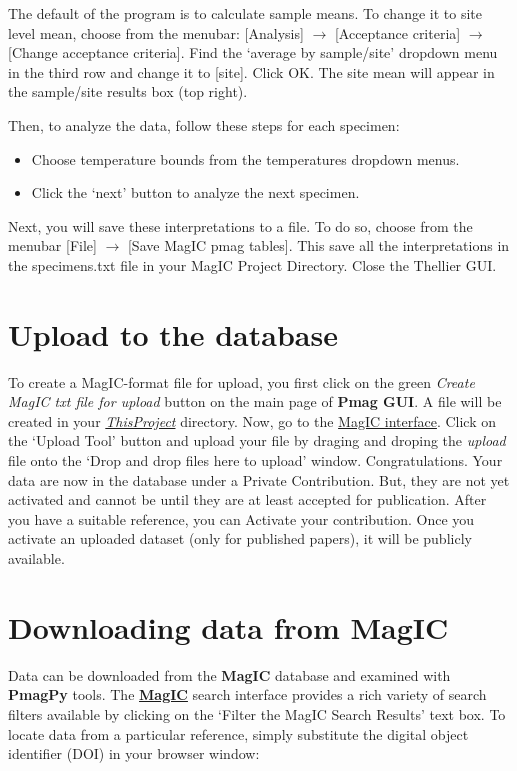 \documentclass[11pt]{book}
\begin{document}
{{The default of the program is to calculate sample means. To change it to site level mean, choose from the menubar: [Analysis] $\rightarrow$ [Acceptance criteria] $\rightarrow$  [Change acceptance criteria]. Find the `average by sample/site' dropdown menu in the third row and change it to [site]. Click OK. The site mean will appear in the sample/site results box (top right).

Then, to analyze the data, follow these steps for each specimen:
 \begin{itemize}
 \item Choose temperature bounds from the temperatures dropdown menus.
 \item  Click the ‘next’ button to analyze the next specimen.
   \end{itemize}
Next, you will save these interpretations to a file.  To do so, choose from the menubar [File] $\rightarrow$ [Save MagIC pmag tables]. This save all the interpretations in the specimens.txt file in your MagIC Project Directory.
Close the Thellier GUI.



\section{Upload to the database }

To create a MagIC-format file for upload, you first click on the green {\it Create MagIC txt file for upload} button on the main page of {\bf Pmag GUI}. A file will be created in your \href{#Project_Directory}{\it ThisProject} directory.  Now, go to the  \href{http://earthref.org/MAGIC/}{MagIC  interface}.      Click on the `Upload Tool' button and upload your file by  draging and droping the {\it upload}   file onto the  `Drop and drop files here to upload' window.
Congratulations. Your data are now in the database under a Private Contribution.  But, they are not yet activated and cannot be until they are at least accepted for publication.  After you have a suitable reference, you can Activate your contribution.  Once you activate an uploaded dataset (only for published papers), it will be publicly available.


\section{Downloading data from {\bf MagIC}}

Data can be downloaded from the {\bf MagIC} database and examined with {\bf PmagPy} tools.   The \href{http://earthref.org/MAGIC/search/}{\bf MagIC} search interface provides a rich variety of search filters available by clicking on the `Filter the MagIC Search Results' text box.    To locate data from a particular reference,  simply substitute the digital object identifier (DOI) in your browser window:

}}
\end{document}
